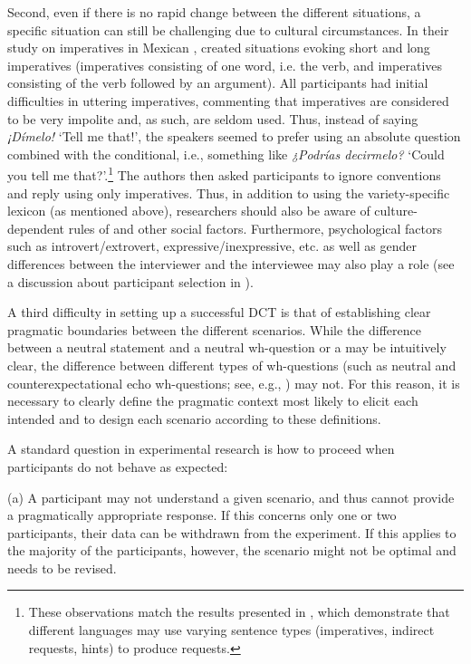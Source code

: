 \documentclass[output=paper]{LSP/langsci}
\begin{document}
Second, even if there is no rapid change between the different situations, a specific situation can still be challenging due to cultural circumstances. In their study on imperatives in Mexican , \citet{Brehm2014} created situations evoking short and long imperatives (imperatives consisting of one word, i.e. the verb, and imperatives consisting of the verb followed by an argument). All participants had initial difficulties in uttering imperatives, commenting that imperatives are considered to be very impolite and, as such, are seldom used. Thus, instead of saying \textit{¡Dímelo!} ‘Tell me that!’, the speakers seemed to prefer using an absolute question combined with the conditional, i.e., something like \textit{¿Podrías decirmelo?} ‘Could you tell me that?’.\footnote{These observations match the results presented in \citet{BlumKulka1989}, which demonstrate that different languages may use varying sentence types (imperatives, indirect requests, hints) to produce requests.} The authors then asked participants to ignore  conventions and reply using only imperatives. Thus, in addition to using the variety-specific lexicon (as mentioned above), researchers should also be aware of culture-dependent rules of  and other social factors. Furthermore, psychological factors such as introvert/extrovert, expressive/inexpressive, etc. as well as gender differences between the interviewer and the interviewee may also play a role (see a discussion about participant selection in \citealt[22--23]{Niebuhr2015}).

A third difficulty in setting up a successful DCT is that of establishing clear pragmatic boundaries between the different scenarios. While the difference between a neutral statement and a neutral wh-question or a  may be intuitively clear, the difference between different types of wh-questions (such as neutral and counterexpectational echo wh-questions; see, e.g., \citealt{Huttenlauch2016}) may not. For this reason, it is necessary to clearly define the pragmatic context most likely to elicit each intended  and to design each scenario according to these definitions.

A standard question in experimental research is how to proceed when par\-ti\-ci\-pants do not behave as expected: 

(a) A participant may not understand a given scenario, and thus cannot provide a pragmatically appropriate response. If this concerns only one or two participants, their data can be withdrawn from the experiment. If this applies to the majority of the par\-ti\-ci\-pants, however, the scenario might not be optimal and needs to be revised. 
\end{document}
